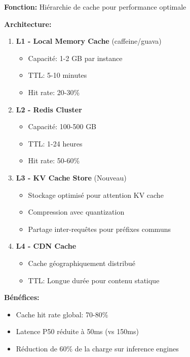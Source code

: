 \documentclass[12pt,a4paper]{article}
\begin{document}
\begin{tcolorbox}[colback=green!5,colframe=green!50!black,title=\textbf{Composant Amélioré: Cache Multi-Niveaux}]

\textbf{Fonction:} Hiérarchie de cache pour performance optimale

\textbf{Architecture:}
\begin{enumerate}[noitemsep]
    \item \textbf{L1 - Local Memory Cache} (caffeine/guava)
    \begin{itemize}[noitemsep]
        \item Capacité: 1-2 GB par instance
        \item TTL: 5-10 minutes
        \item Hit rate: 20-30\%
    \end{itemize}
    
    \item \textbf{L2 - Redis Cluster}
    \begin{itemize}[noitemsep]
        \item Capacité: 100-500 GB
        \item TTL: 1-24 heures
        \item Hit rate: 50-60\%
    \end{itemize}
    
    \item \textbf{L3 - KV Cache Store} (Nouveau)
    \begin{itemize}[noitemsep]
        \item Stockage optimisé pour attention KV cache
        \item Compression avec quantization
        \item Partage inter-requêtes pour préfixes communs
    \end{itemize}
    
    \item \textbf{L4 - CDN Cache}
    \begin{itemize}[noitemsep]
        \item Cache géographiquement distribué
        \item TTL: Longue durée pour contenu statique
    \end{itemize}
\end{enumerate}

\textbf{Bénéfices:}
\begin{itemize}[noitemsep]
    \item Cache hit rate global: 70-80\%
    \item Latence P50 réduite à 50ms (vs 150ms)
    \item Réduction de 60\% de la charge sur inference engines
\end{itemize}
\end{tcolorbox}
\end{document}
